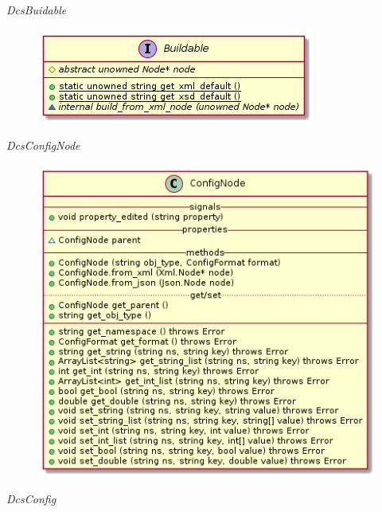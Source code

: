       \emph{DcsBuidable}

        \begin{figure}[H]
          \includegraphics{figures/design/class/core/buildable}
        \end{figure}

      \emph{DcsConfigNode}

        \begin{figure}[H]
          \includegraphics{figures/design/class/core/config-node}
        \end{figure}

      \emph{DcsConfig}

